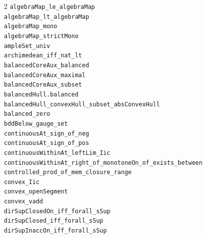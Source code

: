 \documentclass[10pt,a4paper]{article}
\begin{document}
\begin{multicols}{2}
\texttt{algebraMap\_le\_algebraMap} \\
\texttt{algebraMap\_lt\_algebraMap} \\
\texttt{algebraMap\_mono} \\
\texttt{algebraMap\_strictMono} \\
\texttt{ampleSet\_univ} \\
\texttt{archimedean\_iff\_nat\_lt} \\
\texttt{balancedCoreAux\_balanced} \\
\texttt{balancedCoreAux\_maximal} \\
\texttt{balancedCoreAux\_subset} \\
\texttt{balancedHull.\allowbreak{}balanced} \\
\texttt{balancedHull\_convexHull\_subset\_absConvexHull} \\
\texttt{balanced\_zero} \\
\texttt{bddBelow\_gauge\_set} \\
\texttt{continuousAt\_sign\_of\_neg} \\
\texttt{continuousAt\_sign\_of\_pos} \\
\texttt{continuousWithinAt\_leftLim\_Iic} \\
\texttt{continuousWithinAt\_right\_of\_monotoneOn\_of\_exists\_between} \\
\texttt{controlled\_prod\_of\_mem\_closure\_range} \\
\texttt{convex\_Iic} \\
\texttt{convex\_openSegment} \\
\texttt{convex\_vadd} \\
\texttt{dirSupClosedOn\_iff\_forall\_sSup} \\
\texttt{dirSupClosed\_iff\_forall\_sSup} \\
\texttt{dirSupInaccOn\_iff\_forall\_sSup} \\

\end{multicols}
\end{document}
